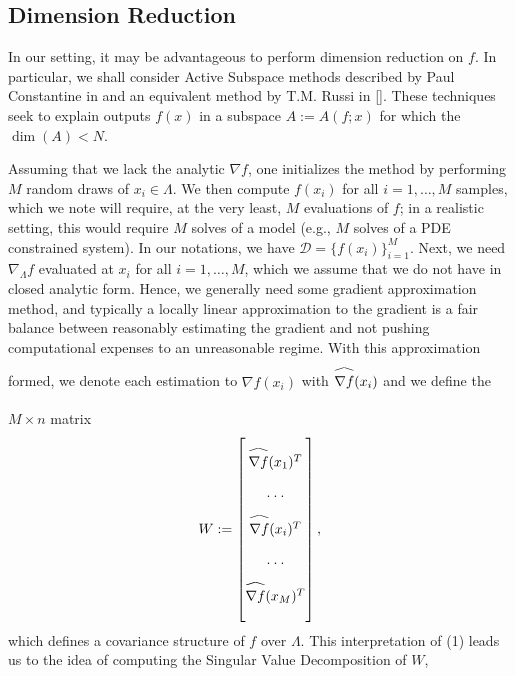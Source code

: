 \documentclass{report}
\newcommand\reallywidehat[1]{\arraycolsep=0pt\relax%
\begin{array}{c}
\stretchto{
  \scaleto{
    \scalerel*[\widthof{\ensuremath{#1}}]{\kern-.5pt\bigwedge\kern-.5pt}
    {\rule[-\textheight/2]{1ex}{\textheight}} %
  }{\textheight} %
}{0.5ex}\\           %
#1\\                 %
\rule{-1ex}{0ex}
\end{array}
}
\begin{document}
\subsection{Dimension Reduction}

In our setting, it may be advantageous to perform dimension reduction on $f$. In particular, we shall consider Active Subspace methods described by Paul Constantine in \cite{Constantine} and an equivalent method by T.M. Russi in []. These techniques seek to explain outputs $f(x)$ in a subspace $A:=A(f;x)$ for which the $\dim (A) <N$. 


\noindent Assuming that we lack the analytic $\nabla f$, one initializes the method by performing $M$ random draws of $x_i \in \Lambda$. We then compute $f(x_i)$ for all $i=1,\ldots,M$ samples, which we note will require, at the very least, $M$ evaluations of $f$; in a realistic setting, this would require $M$ solves of a model (e.g., $M$ solves of a PDE constrained system). In our notations, we have $\mathcal{D}=\{f(x_i)\}_{i=1}^M$. Next, we need $\nabla_\Lambda f$ evaluated at $x_i$ for all $i=1,\ldots,M$, which we assume that we do not have in closed analytic form. Hence, we generally need some gradient approximation method, and typically a locally linear approximation to the gradient is a fair balance between reasonably estimating the gradient and not pushing computational expenses to an unreasonable regime. With this approximation formed, we denote each estimation to $\nabla f(x_i)$ with $\reallywidehat{\nabla f}(x_i)$ and we define the $M \times n$ matrix
\begin{eqnarray}
W:=\begin{bmatrix}
\reallywidehat{\nabla f}(x_1)^T\\
\cdot \cdot \cdot\\
\reallywidehat{\nabla f}(x_i)^T\\
\cdot \cdot \cdot \\
\reallywidehat{\nabla f}(x_M)^T\\
\end{bmatrix},
\end{eqnarray} which defines a covariance structure of $f$ over $\Lambda$. This interpretation of (1) leads us to the idea of computing the Singular Value Decomposition of $W$,
\end{document}
